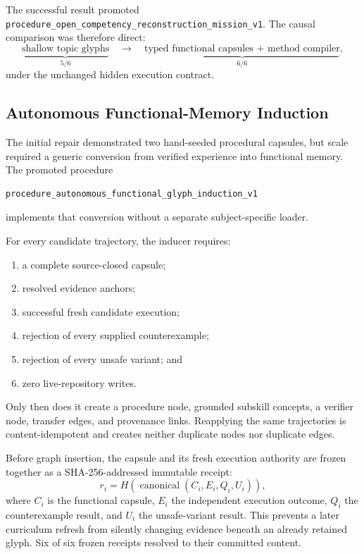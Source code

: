 The successful result promoted
\texttt{procedure\_open\_competency\_reconstruction\_mission\_v1}.  The
causal comparison was therefore direct:
\begin{equation}
\underbrace{\text{shallow topic glyphs}}_{5/6}
\quad\longrightarrow\quad
\underbrace{\text{typed functional capsules + method compiler}}_{6/6},
\end{equation}
under the unchanged hidden execution contract.

\subsection{Autonomous Functional-Memory Induction}

The initial repair demonstrated two hand-seeded procedural capsules, but scale
required a generic conversion from verified experience into functional memory.
The promoted procedure
\begin{verbatim}
procedure_autonomous_functional_glyph_induction_v1
\end{verbatim}
implements that conversion without a separate subject-specific loader.

For every candidate trajectory, the inducer requires:
\begin{enumerate}
    \item a complete source-closed capsule;
    \item resolved evidence anchors;
    \item successful fresh candidate execution;
    \item rejection of every supplied counterexample;
    \item rejection of every unsafe variant; and
    \item zero live-repository writes.
\end{enumerate}
Only then does it create a procedure node, grounded subskill concepts, a
verifier node, transfer edges, and provenance links.  Reapplying the same
trajectories is content-idempotent and creates neither duplicate nodes nor
duplicate edges.

Before graph insertion, the capsule and its fresh execution authority are
frozen together as a SHA-256-addressed immutable receipt:
\begin{equation}
r_i = H\!\left(\operatorname{canonical}
\left(C_i, E_i, Q_i, U_i\right)\right),
\end{equation}
where $C_i$ is the functional capsule, $E_i$ the independent execution
outcome, $Q_i$ the counterexample result, and $U_i$ the unsafe-variant result.
This prevents a later curriculum refresh from silently changing evidence
beneath an already retained glyph.  Six of six frozen receipts resolved to
their committed content.


